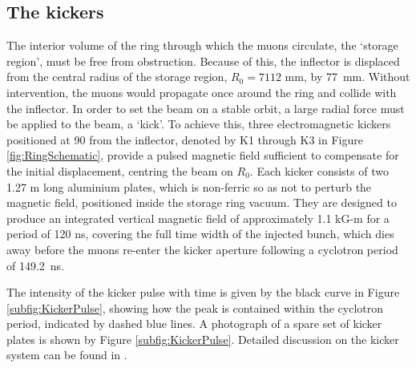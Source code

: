 \subsection{The kickers}

The interior volume of the ring through which the muons circulate, the `storage region', must be free from obstruction. Because of this, the inflector is displaced from the central radius of the storage region, $R_{0}=7112$ mm, by \SI{77}{\milli\metre}. Without intervention, the muons would propagate once around the ring and collide with the inflector. In order to set the beam on a stable orbit, a large radial force must be applied to the beam, a `kick'. To achieve this, three electromagnetic kickers positioned at 90{\degree} from the inflector, denoted by K1 through K3 in Figure \ref{fig:RingSchematic}, provide a pulsed magnetic field sufficient to compensate for the initial displacement, centring the beam on $R_{0}$. Each kicker consists of two 1.27 m long aluminium plates, which is non-ferric so as not to perturb the magnetic field, positioned inside the storage ring vacuum. They are designed to produce an integrated vertical magnetic field of approximately 1.1 kG-m for a period of 120 ns, covering the full time width of the injected bunch, which dies away before the muons re-enter the kicker aperture following a cyclotron period of \SI{149.2}{\nano\second}. 

The intensity of the kicker pulse with time is given by the black curve in Figure \ref{subfig:KickerPulse}, showing how the peak is contained within the cyclotron period, indicated by dashed blue lines. A photograph of a spare set of kicker plates is shown by Figure \ref{subfig:KickerPulse}. Detailed discussion on the kicker system can be found in \cite{KickerPaper}.

